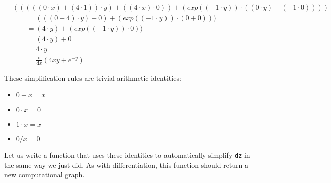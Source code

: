 \documentclass[
  a4paper,
]{article}
\providecommand{\tightlist}{%
  \setlength{\itemsep}{0pt}\setlength{\parskip}{0pt}}
\begin{document}
\begin{align*}
& ( ( ( ( ( 0 \cdot x ) + ( 4 \cdot 1 ) ) \cdot y ) + ( ( 4 \cdot x ) \cdot 0 ) ) + ( exp ( ( -1 \cdot y ) ) \cdot ( ( 0 \cdot y ) + ( -1 \cdot 0 ) ) ) )  \\
&\qquad= ( ( ( 0 + 4 ) \cdot y ) + 0 ) + ( exp ( ( -1 \cdot y ) ) \cdot ( 0 + 0 ) ) ) \\
&\qquad= ( 4 \cdot y ) + ( exp ( ( -1 \cdot y ) ) \cdot 0 ) ) \\
&\qquad= ( 4 \cdot y ) + 0 \\
&\qquad= 4 \cdot y \\
&\qquad= \frac{\text{d}}{\text{d}x} \left(4xy+e^{-y}\right)
\end{align*}

These simplification rules are trivial arithmetic identities:

\begin{itemize}
\tightlist
\item
  \(0+x=x\)
\item
  \(0\cdot x=0\)
\item
  \(1\cdot x=x\)
\item
  \(0/x=0\)
\end{itemize}

Let us write a function that uses these identities to automatically
simplify \texttt{dz} in the same way we just did. As with
differentiation, this function should return a new computational graph.
\end{document}

